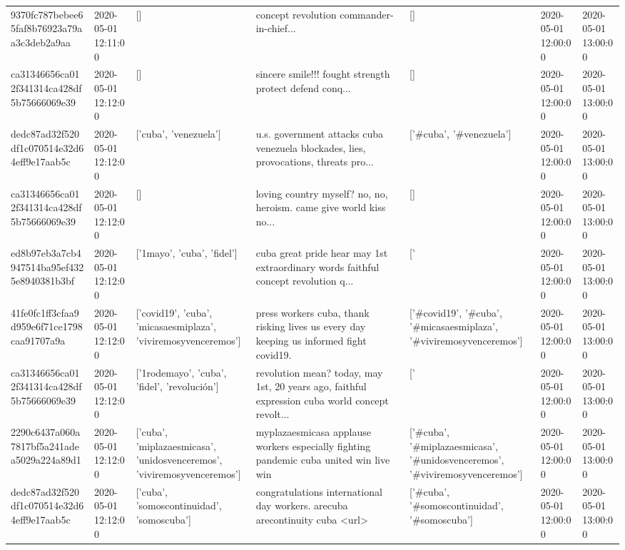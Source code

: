 \begin{tabular}{lllllll}
9370fc787bebee65faf8b76923a79aa3c3deb2a9aa & 2020-05-01 12:11:00 & [] & concept revolution commander-in-chief... & [] & 2020-05-01 12:00:00 & 2020-05-01 13:00:00 \\
ca31346656ca012f341314ca428df5b75666069e39 & 2020-05-01 12:12:00 & [] & sincere smile!!! fought strength protect defend conq... & [] & 2020-05-01 12:00:00 & 2020-05-01 13:00:00 \\
dedc87ad32f520df1c070514e32d64eff9e17aab5c & 2020-05-01 12:12:00 & ['cuba', 'venezuela'] & u.s. government attacks cuba venezuela blockades, lies, provocations, threats pro... & ['#cuba', '#venezuela'] & 2020-05-01 12:00:00 & 2020-05-01 13:00:00 \\
ca31346656ca012f341314ca428df5b75666069e39 & 2020-05-01 12:12:00 & [] & loving country myself? no, no, heroism. came give world kiss no... & [] & 2020-05-01 12:00:00 & 2020-05-01 13:00:00 \\
ed8b97eb3a7cb4947514ba95ef4325e8940381b3bf & 2020-05-01 12:12:00 & ['1mayo', 'cuba', 'fidel'] & cuba great pride hear may 1st extraordinary words faithful concept revolution q... & ['#1mayo', '#cuba', '#fidel'] & 2020-05-01 12:00:00 & 2020-05-01 13:00:00 \\
41fe0fc1ff3cfaa9d959e6f71ce1798caa91707a9a & 2020-05-01 12:12:00 & ['covid19', 'cuba', 'micasaesmiplaza', 'viviremosyvenceremos'] & press workers cuba, thank risking lives us every day keeping us informed fight covid19. & ['#covid19', '#cuba', '#micasaesmiplaza', '#viviremosyvenceremos'] & 2020-05-01 12:00:00 & 2020-05-01 13:00:00 \\
ca31346656ca012f341314ca428df5b75666069e39 & 2020-05-01 12:12:00 & ['1rodemayo', 'cuba', 'fidel', 'revolución'] & revolution mean? today, may 1st, 20 years ago, faithful expression cuba world concept revolt... & ['#1rodemayo', '#cuba', '#fidel', '#revolución'] & 2020-05-01 12:00:00 & 2020-05-01 13:00:00 \\
2290c6437a060a7817bf5a241adea5029a224a89d1 & 2020-05-01 12:12:00 & ['cuba', 'miplazaesmicasa', 'unidosvenceremos', 'viviremosyvenceremos'] & myplazaesmicasa applause workers especially fighting pandemic cuba united win live win & ['#cuba', '#miplazaesmicasa', '#unidosvenceremos', '#viviremosyvenceremos'] & 2020-05-01 12:00:00 & 2020-05-01 13:00:00 \\
dedc87ad32f520df1c070514e32d64eff9e17aab5c & 2020-05-01 12:12:00 & ['cuba', 'somoscontinuidad', 'somoscuba'] & congratulations international day workers. arecuba arecontinuity cuba <url> & ['#cuba', '#somoscontinuidad', '#somoscuba'] & 2020-05-01 12:00:00 & 2020-05-01 13:00:00 \\

\end{tabular}
